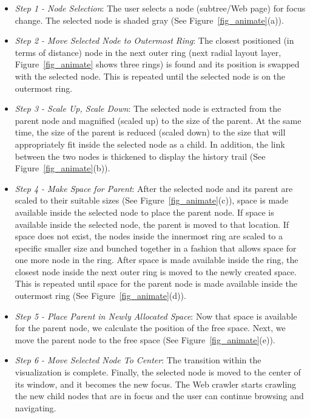 \documentclass[10pt,psfig]{article}
\begin{document}
{\begin{itemize}

\item {\em Step 1 - Node Selection}: The user selects a node (subtree/Web page) for focus change.  The selected node is shaded gray (See Figure~\ref{fig_animate}(a)).

\item {\em Step 2 - Move Selected Node to Outermost Ring}: The closest positioned (in terms of distance) node in the next outer ring (next radial layout layer, Figure~\ref{fig_animate} shows three rings) is found and its position is swapped with the selected node.  This is repeated until the selected node is on the outermost ring.

\item {\em Step 3 - Scale Up, Scale Down}: The selected node is extracted from the parent node and magnified (scaled up) to the size of the parent.  At the same time, the size of the parent is reduced (scaled down) to the size that will appropriately fit inside the selected node as a child.  In addition, the link between the two nodes is thickened to display the history trail (See Figure~\ref{fig_animate}(b)).

\item {\em Step 4 - Make Space for Parent}: After the selected node and its parent are scaled to their suitable sizes (See Figure~\ref{fig_animate}(c)), space is made available inside the selected node to place the parent node.  If space is available inside the selected node, the parent is moved to that location.  If space does not exist, the nodes inside the innermost ring are scaled to a specific smaller size and bunched together in a fashion that allows space for one more node in the ring.  After space is made available inside the ring, the closest node inside the next outer ring is moved to the newly created space.  This is repeated until space for the parent node is made available inside the outermost ring (See Figure~\ref{fig_animate}(d)). 

\item{\em Step 5 - Place Parent in Newly Allocated Space}: Now that space is available for the parent node, we calculate the position of the free space.  Next, we move the parent node to the free space (See Figure~\ref{fig_animate}(e)).

\item{\em Step 6 - Move Selected Node To Center}: The transition within the visualization is complete.
Finally, the selected node is moved to the center of its window, and it becomes the new focus.
The Web crawler starts crawling the new child nodes that are in focus and the user can continue browsing and navigating.


\end{itemize}}
\end{document}
